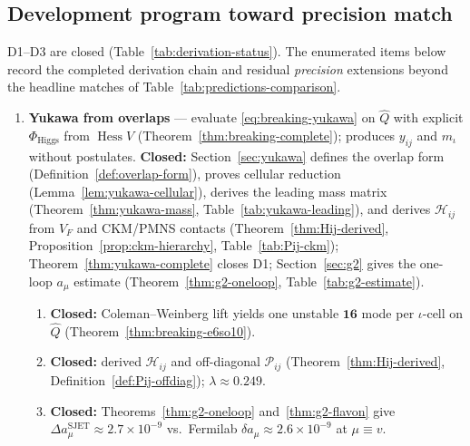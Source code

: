 \documentclass[11pt]{article}
\theoremstyle{plain}
\theoremstyle{definition}
\theoremstyle{remark}
\numberwithin{equation}{section}
\newcommand{\Hess}{\operatorname{Hess}}
\begin{document}
\subsection{Development program toward precision match}
\label{sec:predictions:program}

D1--D3 are closed (Table~\ref{tab:derivation-status}). The enumerated items
below record the completed derivation chain and residual \emph{precision}
extensions beyond the headline matches of
Table~\ref{tab:predictions-comparison}.

\begin{enumerate}[label=\textbf{D\arabic*.},leftmargin=*]
  \item \textbf{Yukawa from overlaps} --- evaluate \eqref{eq:breaking-yukawa}
    on $\hat Q$ with explicit $\Phi_{\mathrm{Higgs}}$ from $\Hess V$
    (Theorem~\ref{thm:breaking-complete}); produces $y_{ij}$ and
    $m_\iota$ without postulates.
    \textbf{Closed:} Section~\ref{sec:yukawa} defines the overlap
    form (Definition~\ref{def:overlap-form}), proves cellular reduction
    (Lemma~\ref{lem:yukawa-cellular}), derives the leading mass matrix
    (Theorem~\ref{thm:yukawa-mass}, Table~\ref{tab:yukawa-leading}), and
    derives $\mathcal{H}_{ij}$ from $V_F$ and CKM/PMNS contacts
    (Theorem~\ref{thm:Hij-derived}, Proposition~\ref{prop:ckm-hierarchy},
    Table~\ref{tab:Pij-ckm}); Theorem~\ref{thm:yukawa-complete} closes D1;
    Section~\ref{sec:g2} gives the one-loop $a_\mu$ estimate
    (Theorem~\ref{thm:g2-oneloop}, Table~\ref{tab:g2-estimate}).
    \begin{enumerate}[label=\textit{D1.\alph*.},leftmargin=2em]
      \item \textbf{Closed:} Coleman--Weinberg lift yields one unstable
        $\mathbf{16}$ mode per $\iota$-cell on $\hat Q$
        (Theorem~\ref{thm:breaking-e6so10}).
      \item \textbf{Closed:} derived $\mathcal{H}_{ij}$ and off-diagonal
        $\mathcal{P}_{ij}$ (Theorem~\ref{thm:Hij-derived},
        Definition~\ref{def:Pij-offdiag}); $\lambda\approx0.249$.
      \item \textbf{Closed:} Theorems~\ref{thm:g2-oneloop}
        and~\ref{thm:g2-flavon} give
        $\Delta a_\mu^{\mathrm{SJET}}\approx2.7\times10^{-9}$ vs.\
        Fermilab $\delta a_\mu\approx2.6\times10^{-9}$ at $\mu\equiv v$.
    \end{enumerate}

\end{enumerate}
\end{document}
